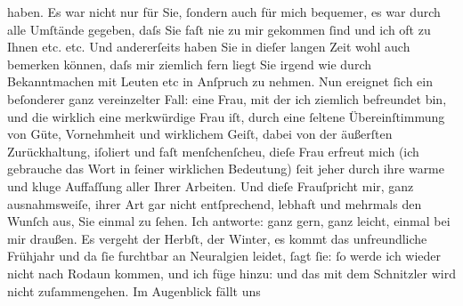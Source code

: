 {\begin{ledgroupsized}[t]{13cm}
               haben. Es war nicht nur für Sie, ſondern auch für mich bequemer, es war durch alle
               Umſtände gegeben, daſs Sie faſt nie zu mir gekommen ſind und ich oft zu Ihnen etc.
               etc.\pend
           \pstart
           {\pb}Und andererſeits haben Sie in
               dieſer langen Zeit wohl auch bemerken können, daſs mir ziemlich fern liegt Sie irgend
               wie durch Bekanntmachen mit Leuten etc in Anſpruch zu nehmen.\pend
           \pstart
           Nun ereignet ſich ein beſonderer ganz vereinzelter Fall: eine Frau, mit der ich ziemlich befreundet bin, {\pb}und die wirklich eine merkwürdige
                  Frau iſt, durch eine ſeltene
               Übereinſtimmung von Güte, Vornehmheit und wirklichem Geiſt, dabei von der äußerſten
               Zurückhaltung, iſoliert und faſt menſchenſcheu, dieſe Frau erfreut mich (ich gebrauche das Wort in ſeiner
               wirklichen Bedeutung) ſeit jeher durch ihre warme {\pb}und kluge Auffaſſung aller Ihrer
               Arbeiten. Und dieſe Frau\strikeout{,}{ }ſpricht mir, ganz ausnahmsweiſe, ihrer Art gar
               nicht entſprechend, lebhaft und mehrmals den Wunſch aus, Sie einmal zu ſehen. Ich
               antworte: ganz gern, ganz leicht, einmal bei mir draußen. Es vergeht der Herbſt, der
               Winter, es {\pb}kommt das
               unfreundliche Frühjahr und da ſie furchtbar an Neuralgien leidet, ſagt ſie: ſo werde
               ich wieder nicht nach Rodaun kommen, und ich füge
               hinzu: und das mit dem Schnitzler wird nicht zuſammengehen. Im Augenblick fällt uns

\end{ledgroupsized}}
